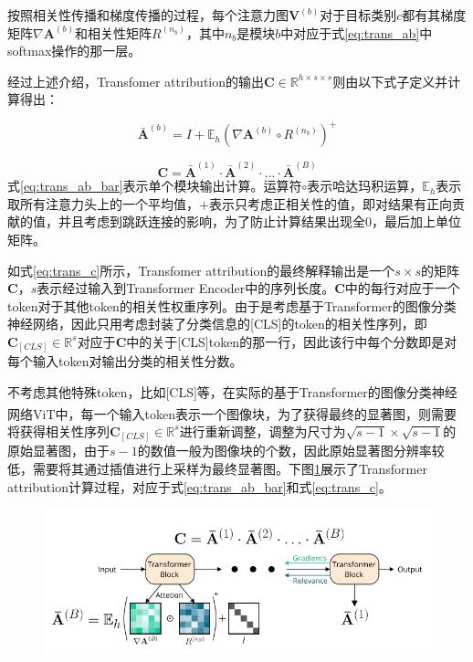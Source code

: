 按照相关性传播和梯度传播的过程，每个注意力图$\mathbf{V}^{(b)}$对于目标类别$c$都有其梯度矩阵$\nabla \mathbf{A}^{(b)}$和相关性矩阵$R^{(n_b)}$，其中$n_b$是模块$b$中对应于式\ref{eq:trans_ab}中softmax操作的那一层。

经过上述介绍，Transfomer attribution的输出$\mathbf{C} \in \mathbb{R}^{h\times s \times s}$则由以下式子定义并计算得出：

\begin{equation}
	\bar{\mathbf{A}}^{(b)} = I + \mathbb{E}_h(\nabla \mathbf{A}^{(b)} \circ R^{(n_b)})^+
	\label{eq:trans_ab_bar}
\end{equation}

\begin{equation}
	 \mathbf{C} = \bar{\mathbf{A}}^{(1)} \cdot \bar{\mathbf{A}}^{(2)} \cdot ... \cdot \bar{\mathbf{A}}^{(B)}
	\label{eq:trans_c}
\end{equation}
式\ref{eq:trans_ab_bar}表示单个模块输出计算。运算符$\circ$表示哈达玛积运算，$\mathbb{E}_h$表示取所有注意力头上的一个平均值，$+$表示只考虑正相关性的值，即对结果有正向贡献的值，并且考虑到跳跃连接的影响，为了防止计算结果出现全0，最后加上单位矩阵。

如式\ref{eq:trans_c}所示，Transfomer attribution的最终解释输出是一个$s\times s$的矩阵$\mathbf{C}$，$s$表示经过输入到Transformer Encoder中的序列长度。$\mathbf{C}$中的每行对应于一个token对于其他token的相关性权重序列。由于是考虑基于Transformer的图像分类神经网络，因此只用考虑封装了分类信息的[CLS]的token的相关性序列，即$\mathbf{C}_{[CLS]} \in \mathbb{R}^s$对应于$\mathbf{C}$中的关于[CLS]token的那一行，因此该行中每个分数即是对每个输入token对输出分类的相关性分数。

不考虑其他特殊token，比如[CLS]等，在实际的基于Transformer的图像分类神经网络ViT\textsuperscript{\cite{dosovitskiy2020image}}中，每一个输入token表示一个图像块，为了获得最终的显著图，则需要将获得相关性序列$\mathbf{C}_{[CLS]} \in \mathbb{R}^s$进行重新调整，调整为尺寸为$\sqrt{s-1}\times \sqrt{s-1}$的原始显著图，由于$s-1$的数值一般为图像块的个数，因此原始显著图分辨率较低，需要将其通过插值进行上采样为最终显著图。下图\ref{fig:trans1}展示了Transformer attribution计算过程，对应于式\ref{eq:trans_ab_bar}和式\ref{eq:trans_c}。
\begin{figure}[h]
	\centering 
	\includegraphics[width=15cm]{fig/ch2/trans1.png}
	\label{fig:trans1}
\end{figure}

